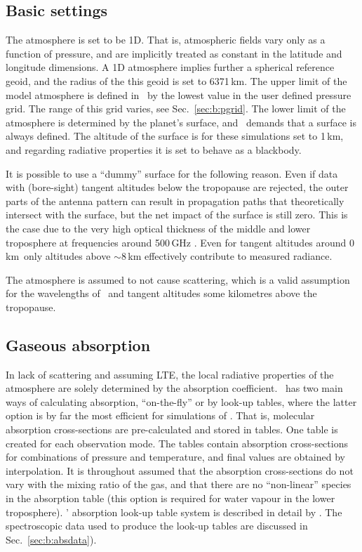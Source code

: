 \subsection{Basic settings}
%
The atmosphere is set to be 1D. That is, atmospheric fields vary only as a
function of pressure, and are implicitly treated as constant in the latitude
and longitude dimensions. A 1D atmosphere implies further a spherical reference
geoid, and the radius of the this geoid is set to 6371\,km. The upper limit of
the model atmosphere is defined in \ARTS\ by the lowest value in the user
defined pressure grid. The range of this grid varies, see
Sec.~\ref{sec:b:pgrid}. The lower limit of the atmosphere is determined by the
planet's surface, and \ARTS\ demands that a surface is always defined. The
altitude of the surface is for these simulations set to 1\,km, and regarding
radiative properties it is set to behave as a blackbody.

It is possible to use a ``dummy'' surface for the following reason. Even if
data with (bore-sight) tangent altitudes below the tropopause are rejected, the
outer parts of the antenna pattern can result in propagation paths that
theoretically intersect with the surface, but the net impact of the surface is
still zero. This is the case due to the very high optical thickness of the
middle and lower troposphere at frequencies around 500\,GHz
\citep{ekstrom:first:07}. Even for tangent altitudes around 0\,km\ only
altitudes above $\sim$8\,km effectively contribute to measured radiance.

The atmosphere is assumed to not cause scattering, which is a valid assumption
for the wavelengths of \smr\ and tangent altitudes some kilometres above the
tropopause. 


\subsection{Gaseous absorption}
%
In lack of scattering and assuming LTE, the local radiative properties of the
atmosphere are solely determined by the absorption coefficient. \ARTS\ has two
main ways of calculating absorption, ``on-the-fly'' or by look-up tables, where
the latter option is by far the most efficient for simulations of \smr. That
is, molecular absorption cross-sections are pre-calculated and stored in
tables. One table is created for each observation mode. The tables contain
absorption cross-sections for combinations of pressure and temperature, and
final values are obtained by interpolation. It is throughout assumed that the
absorption cross-sections do not vary with the mixing ratio of the gas, and that
there are no ``non-linear'' species in the absorption table (this option is
required for water vapour in the lower troposphere).
\ARTS' absorption look-up table system is described in detail by
\citet{buehler:absor:11}. The spectroscopic data used to produce the look-up
tables are discussed in Sec.~\ref{sec:b:absdata}).


